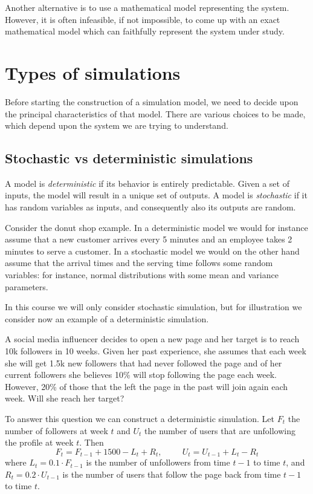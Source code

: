 \documentclass[
]{book}
\begin{document}
Another alternative is to use a mathematical model representing the system. However, it is often infeasible, if not impossible, to come up with an exact mathematical model which can faithfully represent the system under study.

\hypertarget{types-of-simulations}{%
\section{Types of simulations}\label{types-of-simulations}}

Before starting the construction of a simulation model, we need to decide upon the principal characteristics of that model. There are various choices to be made, which depend upon the system we are trying to understand.

\hypertarget{stochastic-vs-deterministic-simulations}{%
\subsection{Stochastic vs deterministic simulations}\label{stochastic-vs-deterministic-simulations}}

A model is \emph{deterministic} if its behavior is entirely predictable. Given a set of inputs, the model will result in a unique set of outputs. A model is \emph{stochastic} if it has random variables as inputs, and consequently also its outputs are random.

Consider the donut shop example. In a deterministic model we would for instance assume that a new customer arrives every 5 minutes and an employee takes 2 minutes to serve a customer. In a stochastic model we would on the other hand assume that the arrival times and the serving time follows some random variables: for instance, normal distributions with some mean and variance parameters.

In this course we will only consider stochastic simulation, but for illustration we consider now an example of a deterministic simulation.

A social media influencer decides to open a new page and her target is to reach 10k followers in 10 weeks. Given her past experience, she assumes that each week she will get 1.5k new followers that had never followed the page and of her current followers she believes 10\% will stop following the page each week. However, 20\% of those that the left the page in the past will join again each week. Will she reach her target?

To answer this question we can construct a deterministic simulation. Let \(F_t\) the number of followers at week \(t\) and \(U_t\) the number of users that are unfollowing the profile at week \(t\). Then
\[
F_t = F_{t-1} + 1500 - L_{t} + R_{t}, \hspace{1cm} U_t= U_{t-1} + L_{t} - R_{t}
\]
where \(L_{t}=0.1\cdot F_{t-1}\) is the number of unfollowers from time \(t-1\) to time \(t\), and \(R_{t}=0.2\cdot U_{t-1}\) is the number of users that follow the page back from time \(t-1\) to time \(t\).
\end{document}
